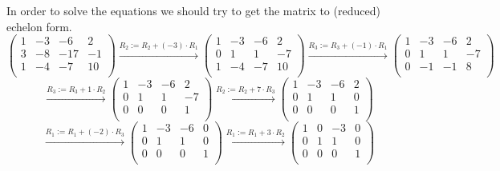 \documentclass[a4paper]{article}
\begin{document}
In order to solve the equations we should try to get the matrix to (reduced) echelon form.
\[
\left(
\begin{array}{ccc|c}
1 & -3 & -6 & 2   \\
3 & -8 & -17 & -1 \\
1 & -4 & -7 & 10   \\
\end{array}
\right)
\xrightarrow{\text{$R_2 := R_2 + (-3) \cdot R_1$}}
\left(
\begin{array}{ccc|c}
1 & -3 & -6 & 2   \\
0 & 1 & 1 & -7 \\
1 & -4 & -7 & 10   \\
\end{array}
\right)
\xrightarrow{\text{$R_3 := R_3 + (-1) \cdot R_1$}}
\left(
\begin{array}{ccc|c}
1 & -3 & -6 & 2   \\
0 & 1 & 1 & -7 \\
0 & -1 & -1 & 8   \\
\end{array}
\right)
\]
\[
\xrightarrow{\text{$R_3 := R_3 + 1 \cdot R_2 $}}
\left(
\begin{array}{ccc|c}
1 & -3 & -6 & 2   \\
0 & 1 & 1 & -7 \\
0 & 0 & 0 & 1   \\
\end{array}
\right)
\xrightarrow{\text{$R_2 := R_2 + 7 \cdot R_3 $}}
\left(
\begin{array}{ccc|c}
1 & -3 & -6 & 2   \\
0 & 1 & 1 & 0 \\
0 & 0 & 0 & 1   \\
\end{array}
\right)
\]
\[
\xrightarrow{\text{$R_1 := R_1 + (-2) \cdot R_3 $}}
\left(
\begin{array}{ccc|c}
1 & -3 & -6 & 0   \\
0 & 1 & 1 & 0 \\
0 & 0 & 0 & 1   \\
\end{array}
\right)
\xrightarrow{\text{$R_1 := R_1 + 3 \cdot R_2 $}}
\left(
\begin{array}{ccc|c}
1 & 0 & -3 & 0   \\
0 & 1 & 1 & 0 \\
0 & 0 & 0 & 1   \\
\end{array}
\right)
\]
\end{document}
